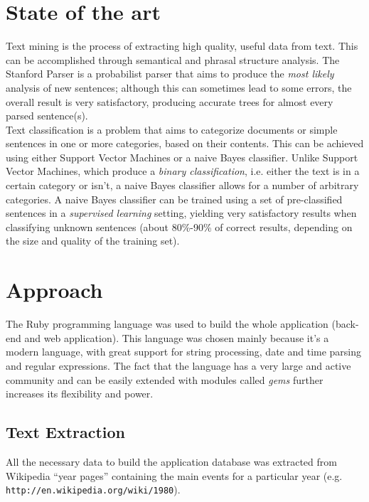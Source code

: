 \documentclass{llncs}
\begin{document}
\section{State of the art}

Text mining is the process of extracting high quality, useful data from text. This can be accomplished through semantical and phrasal structure analysis. The Stanford Parser is a probabilist parser that aims to produce the \textit{most likely} analysis of new sentences; although this can sometimes lead to some errors, the overall result is very satisfactory, producing accurate trees for almost every parsed sentence(s).\\

Text classification is a problem that aims to categorize documents or simple sentences in one or more categories, based on their contents. This can be achieved using either Support Vector Machines or a naive Bayes classifier. Unlike Support Vector Machines, which produce a \textit{binary classification}, i.e. either the text is in a certain category or isn't, a naive Bayes classifier allows for a number of arbitrary categories. A naive Bayes classifier can be trained using a set of pre-classified sentences in a \textit{supervised learning} setting, yielding very satisfactory results when classifying unknown sentences (about 80\%-90\% of correct results, depending on the size and quality of the training set).

\section{Approach}
\label{sec:approach}

The Ruby programming language was used to build the whole application (back-end and web application). This language was chosen mainly because it's a modern language, with great support for string processing, date and time parsing and regular expressions. The fact that the language has a very large and active community and can be easily extended with modules called \textit{gems} further increases its flexibility and power.

\subsection{Text Extraction}

All the necessary data to build the application database was extracted from Wikipedia ``year pages'' containing the main events for a particular year (e.g. \verb!http://en.wikipedia.org/wiki/1980!).\\
\end{document}
